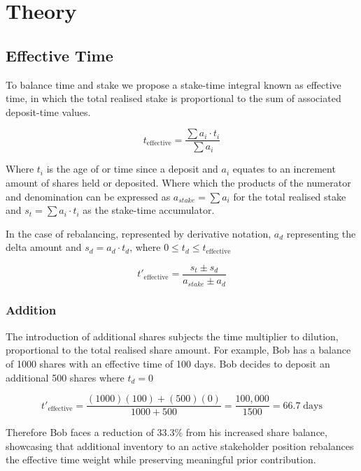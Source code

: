 \documentclass[a4paper,12pt]{article}
\begin{document}
\section{\signifier Theory}

\subsection{\signifier Effective Time}

To balance time and stake we propose a stake-time integral known as effective time, in which the total realised stake is proportional to the sum of associated deposit-time values. 

\begin{equation}
t_{\text{effective}} = \frac{\sum a_i \cdot t_i}{\sum a_i}  
\end{equation}
\vspace{0.5pt}

Where $t_i$ is the age of or time since a deposit and $a_i$ equates to an increment amount of shares held or deposited. Where which the products of the numerator and denomination can be expressed as $a_{stake} = \sum a_i$ for the total realised stake and $s_t =  \sum a_i \cdot t_i$ as the stake-time accumulator.

\newpage

In the case of rebalancing, represented by derivative notation, $a_d$ representing the delta amount and $s_d = a_d \cdot t_d$, where $0 \leq t_d \leq t_\text{effective}$ 

\begin{equation}
t'_{\text{effective}} = \frac{ s_t \pm s_d}{a_{stake} \pm a_d}
\end{equation}

\subsubsection{\signifier Addition}
The introduction of additional shares subjects the time multiplier to dilution, proportional to the total realised share amount. For example, Bob has a balance of 1000 shares with an effective time of 100 days. Bob decides to deposit an additional 500 shares where $t_d = 0$

\begin{equation*}
{t'}_{\text{effective}} = \frac{(1000)(100) + (500)(0)}{1000 + 500} 
= \frac{100{,}000}{1500} 
= 66.7 \; \text{days}
\end{equation*}

Therefore Bob faces a reduction of 33.3\% from his increased share balance, showcasing that additional inventory to an active stakeholder position rebalances the effective time weight while preserving meaningful prior contribution. 
\end{document}
